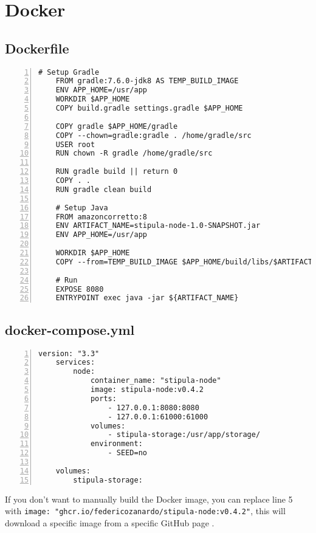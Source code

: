 
\chapter{Docker}
\label{app:docker}

\section{Dockerfile}

\begin{Verbatim}[numbers=left,xleftmargin=1cm,firstnumber=1,breaklines=true,tabsize=2]
	# Setup Gradle
	FROM gradle:7.6.0-jdk8 AS TEMP_BUILD_IMAGE
	ENV APP_HOME=/usr/app
	WORKDIR $APP_HOME
	COPY build.gradle settings.gradle $APP_HOME
	
	COPY gradle $APP_HOME/gradle
	COPY --chown=gradle:gradle . /home/gradle/src
	USER root
	RUN chown -R gradle /home/gradle/src
	
	RUN gradle build || return 0
	COPY . .
	RUN gradle clean build
	
	# Setup Java
	FROM amazoncorretto:8
	ENV ARTIFACT_NAME=stipula-node-1.0-SNAPSHOT.jar
	ENV APP_HOME=/usr/app
	
	WORKDIR $APP_HOME
	COPY --from=TEMP_BUILD_IMAGE $APP_HOME/build/libs/$ARTIFACT_NAME .
	
	# Run
	EXPOSE 8080
	ENTRYPOINT exec java -jar ${ARTIFACT_NAME}
\end{Verbatim}

\newpage
\section{docker-compose.yml}
\begin{Verbatim}[numbers=left,xleftmargin=1cm,firstnumber=1,breaklines=true,tabsize=2]
	version: "3.3"
	services:
		node:
			container_name: "stipula-node"
			image: stipula-node:v0.4.2
			ports:
				- 127.0.0.1:8080:8080
				- 127.0.0.1:61000:61000
			volumes:
				- stipula-storage:/usr/app/storage/
			environment:
				- SEED=no

	volumes:
		stipula-storage:
\end{Verbatim}

If you don't want to manually build the Docker image, you can replace line 5 with 
\verb|image: "ghcr.io/federicozanardo/stipula-node:v0.4.2"|, this will download a specific 
image from a specific GitHub page \autocite{site:stipula-github-available-packages}.
